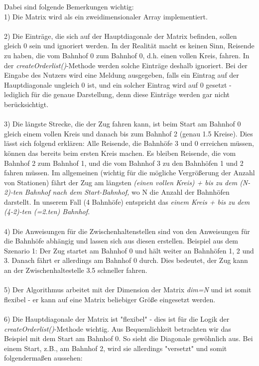 Dabei sind folgende Bemerkungen wichtig:\\
1) Die Matrix wird als ein zweidimensionaler Array implementiert.\\
\\
2) Die Einträge, die sich auf der Hauptdiagonale der Matrix befinden, sollen gleich 0 sein und ignoriert werden. In der Realität macht es keinen Sinn, Reisende zu haben, die vom Bahnhof 0 zum Bahnhof 0, d.h. einen vollen Kreis, fahren. In der \textit{createOrderlist()}-Methode werden solche Einträge deshalb ignoriert. Bei der Eingabe des Nutzers wird eine Meldung ausgegeben, falls ein Eintrag auf der Hauptdiagonale ungleich 0 ist, und ein solcher Eintrag wird auf 0 gesetzt - lediglich für die genaue Darstellung, denn diese Einträge werden gar nicht berücksichtigt.\\
\\
3) Die längste Strecke, die der Zug fahren kann, ist beim Start am Bahnhof 0 gleich einem vollen Kreis und danach bis zum Bahnhof 2 (genau 1.5 Kreise). Dies lässt sich folgend erklären: Alle Reisende, die Bahnhöfe 3 und 0 erreichen müssen, können das bereits beim ersten Kreis machen. Es bleiben Reisende, die vom Bahnhof 2 zum Bahnhof 1, und die vom Bahnhof 3 zu den Bahnhöfen 1 und 2 fahren müssen. Im allgemeinen (wichtig für die mögliche Vergrößerung der Anzahl von Stationen) fährt der Zug am längsten \textit{(einen vollen Kreis) + bis zu dem (N-2)-ten Bahnhof nach dem Start-Bahnhof,} wo N die Anzahl der Bahnhöfen darstellt. In unserem Fall (4 Bahnhöfe) entspricht das \textit{einem Kreis + bis zu dem (4-2)-ten (=2.ten) Bahnhof.}\\
\\
4) Die Anweisungen für die Zwischenhaltenstellen sind von den Anweisungen für die Bahnhöfe abhängig und lassen sich aus diesen erstellen. Beispiel aus dem Szenario 1: Der Zug startet am Bahnhof 0 und hält weiter an Bahnhöfen 1, 2 und 3. Danach fährt er allerdings am Bahnhof 0 durch. Dies bedeutet, der Zug kann an der Zwischenhaltestelle 3.5 schneller fahren.\\
\\
5) Der Algorithmus arbeitet mit der Dimension der Matrix \textit{dim=N} und ist somit flexibel - er kann auf eine Matrix beliebiger Größe eingesetzt werden.\\
\\
6) Die Hauptdiagonale der Matrix ist "flexibel" - dies ist für die Logik der \textit{createOrderlist()}-Methode wichtig. Aus Bequemlichkeit betrachten wir das Beispiel mit dem Start am Bahnhof 0. So sieht die Diagonale gewöhnlich aus. Bei einem Start, z.B., am Bahnhof 2, wird sie allerdings "versetzt" und somit folgendermaßen aussehen:\\
